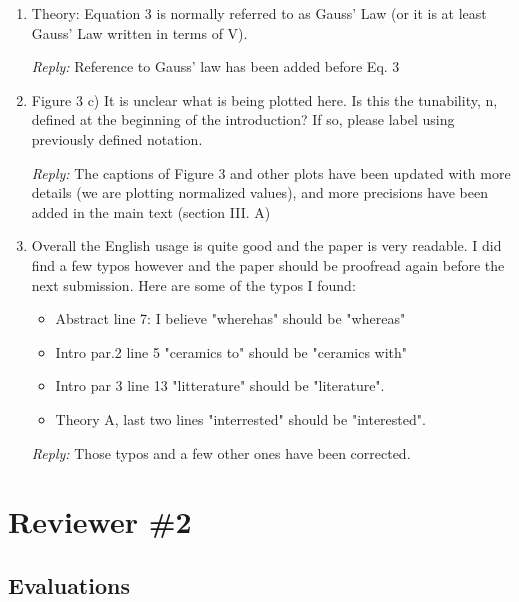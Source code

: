 \documentclass[%
 aip,
 amsmath,amssymb,
 reprint,%
]{revtex4-1}
\newcommand{\rep}[1]{\textcolor{reply}{\textit{Reply:} #1}}
\begin{document}
\begin{enumerate}
\rep{Details about the composition, fabrication and measurements of the samples at DC and microwave frequencies have been added at the beginning of Section II A.}


\item Theory: Equation 3 is normally referred to as Gauss' Law (or it is at least Gauss' Law written in
 terms of V).

 \rep{Reference to Gauss' law has been added before Eq. 3}

\item Figure 3 c) It is unclear what is being plotted here. Is this the tunability, n, defined at the
 beginning of the introduction? If so, please label using previously defined notation.


 \rep{The captions of Figure 3 and other plots have been updated with more details (we are plotting normalized values),
 and more precisions have been added in the main text (section III. A)}




\item Overall the English usage is quite good and the paper is very readable. I did find a few typos
 however and the paper should be proofread again before the next submission. Here are some of the typos I
  found:
\begin{itemize}
  \item Abstract line 7: I believe "wherehas" should be "whereas"

  \item Intro par.2 line 5 "ceramics to" should be "ceramics with"

  \item Intro par 3 line 13 "litterature" should be "literature".

  \item Theory A, last two lines "interrested" should be "interested".
\end{itemize}
\rep{Those typos and a few other ones have been corrected.}

\end{enumerate}

\section{Reviewer \#2}
\subsection{Evaluations}
\end{document}
